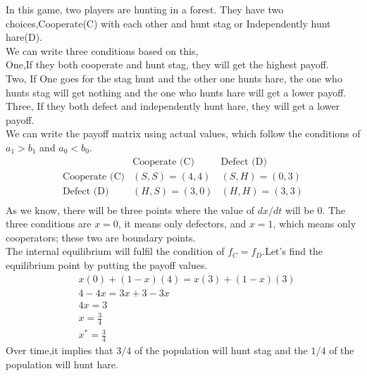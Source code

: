 \documentclass{article}
\begin{document}
In this game, two players are hunting in a forest. They have two choices,Cooperate(C) with each other and hunt stag or Independently hunt hare(D).\\
We can write three conditions based on this,\\
One,If they both cooperate and hunt stag, they will get the highest payoff.\\
Two, If One goes for the stag hunt and the other one hunts hare, the one who hunts stag will get nothing and the one who hunts hare will get a lower payoff.\\
Three, If they both defect and independently hunt hare, they will get a lower payoff.\\
We can write the payoff matrix using actual values, which follow the conditions of $a_1>b_1$ and $a_0<b_0$.
\[
\begin{array}{c|cc}
   & \text{Cooperate (C)} & \text{Defect (D)} \\
  \hline
  \text{Cooperate (C)} & (S,S) = (4,4) & (S,H) = (0,3) \\
  \text{Defect (D)} & (H,S) = (3,0) & (H,H) = (3,3) \\
\end{array}
\]
As we know, there will be three points where the value of $dx/dt$ will be $0$. The three conditions are $x=0$, it means only defectors, and $x=1$, which means only cooperators; these two are boundary points.\\
The internal equilibrium will fulfil the condition of $f_C=f_D$.Let's find the equilibrium point by putting the payoff values.\\
\begin{align}
&x(0)+(1-x)(4)=x(3)+(1-x)(3) \nonumber\\
&4-4x=3x+3-3x \nonumber\\
&4x=3 \nonumber\\
&x= \frac{3}{4} \nonumber\\
&x^*=\frac{3}{4}\nonumber
\end{align}
Over time,it implies that  $3/4$ of the population will hunt stag and the $1/4$ of the population will hunt hare.\\
\end{document}
